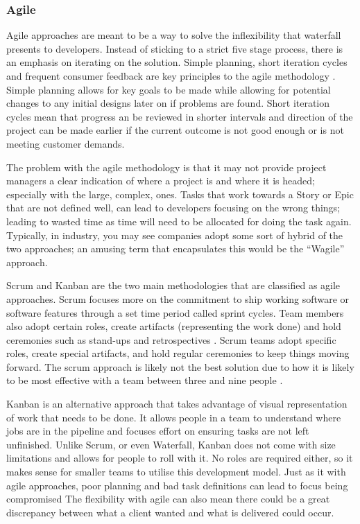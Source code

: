 \subsubsection*{Agile}
Agile approaches are meant to be a way to solve the inflexibility that waterfall presents to developers. 
Instead of sticking to a strict five stage process, there is an emphasis on iterating on the solution. 
Simple planning, short iteration cycles and frequent consumer feedback are key principles to the agile methodology \cite{huo2004software}.
Simple planning allows for key goals to be made while allowing for potential changes to any initial designs later on if problems are found.
Short iteration cycles mean that progress an be reviewed in shorter intervals and direction of the project can be made earlier if
the current outcome is not good enough or is not meeting customer demands.

The problem with the agile methodology is that it may not provide project managers a clear indication of where a project is and where it is 
headed; especially with the large, complex, ones.
Tasks that work towards a Story or Epic that are not defined well, can lead to developers focusing on the wrong things; leading to wasted time 
as time will need to be allocated for doing the task again.
Typically, in industry, you may see companies adopt some sort of hybrid of the two approaches; an amusing term that encapsulates this would
be the ``Wagile'' approach. 

Scrum and Kanban are the two main methodologies that are classified as agile approaches.
Scrum focuses more on the commitment to ship working software or software features through a set time period called sprint cycles.
Team members also adopt certain roles, create artifacts (representing the work done) and hold ceremonies such as stand-ups and
retrospectives \cite{max2019kanbanvscrum}.
Scrum teams adopt specific roles, create special artifacts, and hold regular ceremonies to keep things moving forward. 
The scrum approach is likely not the best solution due to how it is likely to be most effective with a team between three and
nine people \cite{sutherlandschwaber2017scrum}. 

Kanban is an alternative approach that takes advantage of visual representation of work that needs to be done.
It allows people in a team to understand where jobs are in the pipeline and focuses effort on ensuring tasks are not left unfinished.
Unlike Scrum, or even Waterfall, Kanban does not come with size limitations and allows for people to roll with it.
No roles are required either, so it makes sense for smaller teams to utilise this development model.
Just as it with agile approaches, poor planning and bad task definitions can lead to focus being compromised
The flexibility with agile can also mean there could be a great discrepancy between what a client wanted and what is delivered could occur.

